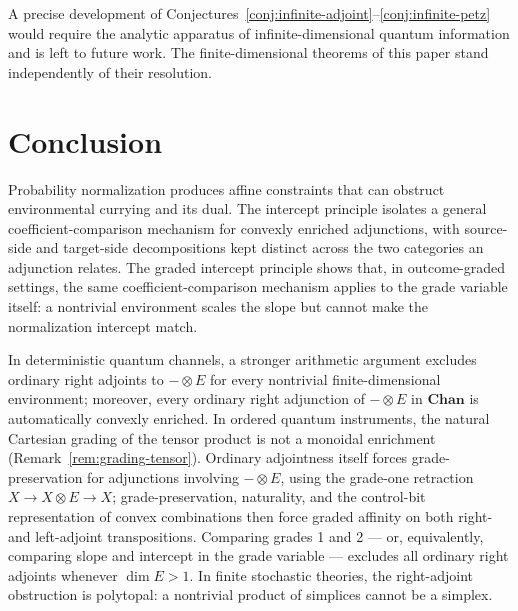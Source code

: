 \documentclass[11pt]{article}
\begin{document}
A precise development of Conjectures~\ref{conj:infinite-adjoint}--\ref{conj:infinite-petz}
would require the analytic apparatus of infinite-dimensional quantum information
\cite{Holevo2012, GschwendtnerWinter2021, KretschmannSchlingemannWerner2008} and
is left to future work. The finite-dimensional theorems of this paper stand
independently of their resolution.

\section*{Conclusion}

Probability normalization produces affine constraints that can obstruct
environmental currying and its dual. The intercept principle isolates a
general coefficient-comparison mechanism for convexly enriched adjunctions,
with source-side and target-side decompositions kept distinct
across the two categories an adjunction relates. The graded intercept
principle shows that, in outcome-graded settings, the same
coefficient-comparison mechanism applies to the grade variable itself: a
nontrivial environment scales the slope but cannot make the normalization
intercept match.

In deterministic quantum channels, a stronger arithmetic argument excludes
ordinary right adjoints to $-\otimes E$ for every nontrivial
finite-dimensional environment; moreover, every ordinary right adjunction of
$-\otimes E$ in $\mathbf{Chan}$ is automatically convexly enriched. In ordered
quantum
instruments, the natural Cartesian grading of the tensor product is not a
monoidal enrichment (Remark~\ref{rem:grading-tensor}). Ordinary adjointness
itself forces grade-preservation for adjunctions involving $-\otimes E$,
using the grade-one retraction $X\to X\otimes E\to X$; grade-preservation,
naturality, and the control-bit representation of convex combinations then
force graded affinity on both right- and left-adjoint transpositions.
Comparing grades 1 and 2 --- or, equivalently, comparing slope and
intercept in the grade variable --- excludes all ordinary right adjoints
whenever $\dim E>1$. In finite stochastic theories, the right-adjoint
obstruction is polytopal: a nontrivial product of simplices cannot be a
simplex.
\end{document}
